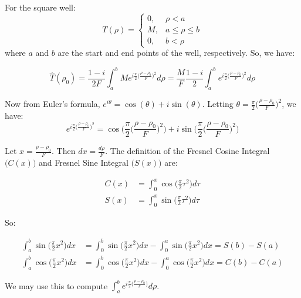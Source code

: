 \documentclass{article}
\theoremstyle{mystyle}
\begin{document}
For the square well:
\begin{equation}
T(\rho) = \begin{cases} 0, & \rho<a \\ M, & a \leq \rho \leq b \\ 0, & b < \rho\end{cases}
\end{equation}
where $a$ and $b$ are the start and end points of the well, respectively. So, we have:

\begin{equation}
\hat{T}(\rho_0) = \frac{1-i}{2F}\int_{a}^{b}Me^{i\frac{\pi}{2}\big(\frac{\rho-\rho_0}{F}\big)^2}d\rho = \frac{M}{F}\frac{1-i}{2}\int_{a}^{b}e^{i\frac{\pi}{2}\big(\frac{\rho-\rho_0}{F}\big)^2}d\rho
\end{equation}

Now from Euler's formula, $e^{i\theta} = \cos(\theta)+i\sin(\theta).$ Letting $\theta = \frac{\pi}{2}\big(\frac{\rho-\rho_0}{F}\big)^2$, we have:
\begin{equation}
e^{i\frac{\pi}{2}\big(\frac{\rho-\rho_0}{F}\big)^2} = \cos\bigg(\frac{\pi}{2}\big(\frac{\rho-\rho_0}{F}\big)^2\bigg)+i\sin\bigg(\frac{\pi}{2}\big(\frac{\rho-\rho_0}{F}\big)^2\bigg)
\end{equation}

Let $x = \frac{\rho - \rho_0}{F}$. Then $dx = \frac{d\rho}{F}$. The definition of the Fresnel Cosine Integral $\big(C(x)\big)$ and Fresnel Sine Integral $\big(S(x)\big)$ are:

\begin{align}
C(x) &= \int_{0}^{x} \cos\big(\frac{\pi}{2}\tau^2\big)d\tau \\
S(x) &= \int_{0}^{x} \sin\big(\frac{\pi}{2}\tau^2\big)d\tau
\end{align}

So:

\begin{align}
\int_{a}^{b} \sin\bigg(\frac{\pi}{2}x^2\bigg)dx &= \int_{0}^{b}\sin\bigg(\frac{\pi}{2}x^2\bigg)dx - \int_{0}^{a}\sin\bigg(\frac{\pi}{2}x^2\bigg)dx = S(b) - S(a) \\
\int_{a}^{b} \cos\bigg(\frac{\pi}{2}x^2\bigg)dx &= \int_{0}^{b} \cos\bigg(\frac{\pi}{2}x^2\bigg)dx - \int_{0}^{a}\cos\bigg(\frac{\pi}{2}x^2\bigg)dx = C(b) - C(a)
\end{align}

We may use this to compute $\int_{a}^{b} e^{i\frac{\pi}{2}\big(\frac{\rho-\rho_0}{F}\big)}d\rho$.
\end{document}
